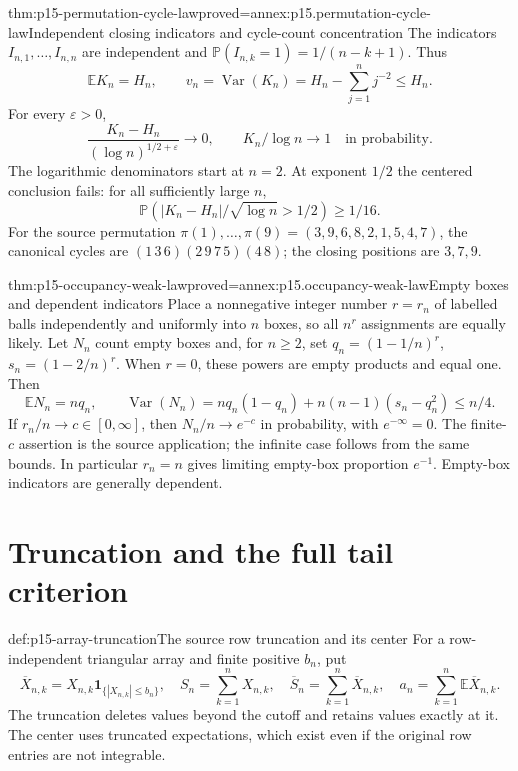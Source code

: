 \begin{hbtheorem}{thm:p15-permutation-cycle-law}{proved=annex:p15.permutation-cycle-law}{Independent closing indicators and cycle-count concentration}
The indicators \(I_{n,1},\ldots,I_{n,n}\) are independent and
\(\mathbb P(I_{n,k}=1)=1/(n-k+1)\). Thus
\[
 \mathbb EK_n=H_n,\qquad
 v_n=\operatorname{Var}(K_n)=H_n-\sum_{j=1}^n j^{-2}\leq H_n.
\]
For every \(\varepsilon>0\),
\[
 \frac{K_n-H_n}{(\log n)^{1/2+\varepsilon}}\longrightarrow0,
 \qquad K_n/\log n\longrightarrow1
                                     \quad\text{in probability}.
\]
The logarithmic denominators start at \(n=2\). At exponent \(1/2\)
the centered conclusion fails: for all sufficiently large \(n\),
\[
 \mathbb P(|K_n-H_n|/\sqrt{\log n}>1/2)\geq1/16.
\]
For the source permutation
\(\pi(1),\ldots,\pi(9)=(3,9,6,8,2,1,5,4,7)\),
the canonical cycles are \((1\,3\,6)(2\,9\,7\,5)(4\,8)\);
the closing positions are \(3,7,9\).
\end{hbtheorem}

\begin{hbtheorem}{thm:p15-occupancy-weak-law}{proved=annex:p15.occupancy-weak-law}{Empty boxes and dependent indicators}
Place a nonnegative integer number \(r=r_n\) of labelled balls independently and uniformly into
\(n\) boxes, so all \(n^r\) assignments are equally likely.
Let \(N_n\) count empty boxes and, for \(n\geq2\), set
\(q_n=(1-1/n)^r\), \(s_n=(1-2/n)^r\).
When \(r=0\), these powers are empty products and equal one.
Then
\[
 \mathbb EN_n=nq_n,\qquad
 \operatorname{Var}(N_n)
    =nq_n(1-q_n)+n(n-1)(s_n-q_n^2)\leq n/4.
\]
If \(r_n/n\to c\in[0,\infty]\), then
\(N_n/n\to e^{-c}\) in probability, with \(e^{-\infty}=0\).
The finite-\(c\) assertion is the source application; the infinite
case follows from the same bounds. In particular \(r_n=n\)
gives limiting empty-box proportion \(e^{-1}\).
Empty-box indicators are generally dependent.
\end{hbtheorem}

\section{Truncation and the full tail criterion}
\label{sec:p15-truncation-weak-criterion}

\begin{hbdefinition}{def:p15-array-truncation}{The source row truncation and its center}
For a row-independent triangular array and finite positive \(b_n\),
put
\[
 \overline X_{n,k}=X_{n,k}\mathbf1_{\{|X_{n,k}|\leq b_n\}},
 \quad S_n=\sum_{k=1}^nX_{n,k},\quad
 \overline S_n=\sum_{k=1}^n\overline X_{n,k},\quad
 a_n=\sum_{k=1}^n\mathbb E\overline X_{n,k}.
\]
The truncation deletes values beyond the cutoff and retains values
exactly at it. The center uses truncated expectations, which exist
even if the original row entries are not integrable.
\end{hbdefinition}


